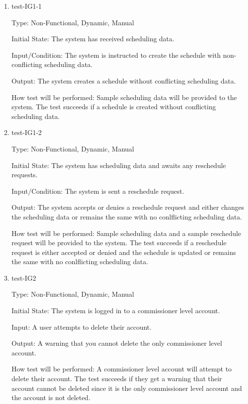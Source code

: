 \documentclass[12pt, titlepage]{article}
\begin{document}
\begin{enumerate}
  \item{test-IG1-1\\}

  Type: Non-Functional, Dynamic, Manual

  Initial State: The system has received scheduling data.

  Input/Condition: The system is instructed to create the schedule with non-conflicting
  scheduling data.

  Output: The system creates a schedule without conflicting scheduling data.

  How test will be performed: Sample scheduling data will be provided to the system. The test
  succeeds if a schedule is created without conflicting scheduling data.

  \item{test-IG1-2\\}

  Type: Non-Functional, Dynamic, Manual

  Initial State: The system has scheduling data and awaits any reschedule requests.

  Input/Condition: The system is sent a reschedule request.

  Output: The system accepts or denies a reschedule request and either changes the scheduling
  data or remains the same with no conlflicting scheduling data.

  How test will be performed: Sample scheduling data and a sample reschedule request
  will be provided to the system. The test succeeds if a reschedule request is either accepted
  or denied and the schedule is updated or remains the same with no conlflicting scheduling
  data.

  \item{test-IG2\\}

  Type: Non-Functional, Dynamic, Manual

  Initial State: The system is logged in to a commissioner level account.

  Input: A user attempts to delete their account.

  Output: A warning that you cannot delete the only commissioner level
  account.

  How test will be performed: A commissioner level account will attempt to
  delete their account. The test succeeds if they get a warning that their
  account cannot be deleted since it is the only commissioner level account
  and the account is not deleted.


\end{enumerate}
\end{document}
